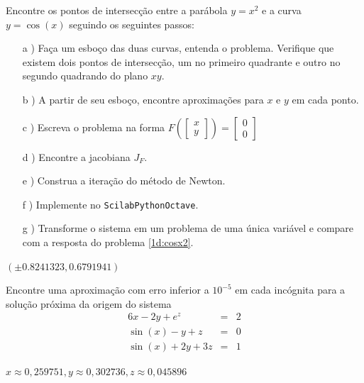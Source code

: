 \begin{exer} Encontre os pontos de intersecção entre a parábola $y=x^2$ e a curva $y=\cos(x)$ seguindo os seguintes passos:
\begin{itemize}
\item[a]) Faça um esboço das duas curvas, entenda o problema. Verifique que existem dois pontos de intersecção, um no primeiro quadrante e outro no segundo quadrando do plano $xy$.
\item[b]) A partir de seu esboço, encontre aproximações para $x$ e $y$ em cada ponto.
\item[c]) Escreva o problema na forma $F\left(\left[\begin{array}{c}x\\y\end{array}\right]\right)=\left[\begin{array}{c}0\\0\end{array}\right]$
\item[d]) Encontre a jacobiana $J_F$.
\item[e]) Construa a iteração do método de Newton.
\item[f]) Implemente no \ifisscilab\verb+Scilab+\fi\ifispython\verb+Python+\fi\ifisoctave\verb+Octave+\fi.
\item[g]) Transforme o sistema em um problema de uma única variável e compare com a resposta do problema \ref{1d:cosx2}.
\end{itemize}
\end{exer}

\begin{resp}
 $\left(\pm 0.8241323, 0.6791941\right)$
\end{resp}

\begin{exer} Encontre uma aproximação com erro inferior a $10^{-5}$ em cada incógnita para a solução próxima da origem do sistema
\begin{eqnarray*}
6x-2y+e^{z}&=&2\\
\sin(x)-y+z&=&0\\
\sin(x)+2y+3z&=&1
\end{eqnarray*}
\end{exer}
\begin{resp}
$x\approx 0,259751, y\approx  0,302736, z\approx  0,045896$
\end{resp}



